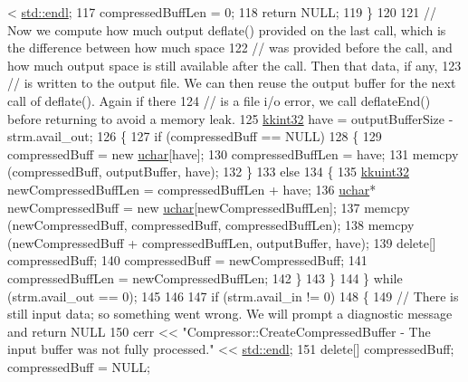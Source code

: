 \begin{DoxyCode}
      < \hyperlink{namespace_k_k_b_ad1f50f65af6adc8fa9e6f62d007818a8}{std::endl};
117         compressedBuffLen = 0;
118         \textcolor{keywordflow}{return} NULL;
119       \}
120       
121       \textcolor{comment}{// Now we compute how much output deflate() provided on the last call, which is the difference
       between how much space}
122       \textcolor{comment}{// was provided before the call, and how much output space is still available after the call. Then
       that data, if any,}
123       \textcolor{comment}{// is written to the output file. We can then reuse the output buffer for the next call of deflate().
       Again if there}
124       \textcolor{comment}{// is a file i/o error, we call deflateEnd() before returning to avoid a memory leak.}
125       \hyperlink{namespace_k_k_b_a8fa4952cc84fda1de4bec1fbdd8d5b1b}{kkint32} have = outputBufferSize - strm.avail\_out;
126       \{
127         \textcolor{keywordflow}{if}  (compressedBuff == NULL)
128         \{
129           compressedBuff = \textcolor{keyword}{new} \hyperlink{namespace_k_k_b_ace9969169bf514f9ee6185186949cdf7}{uchar}[have];
130           compressedBuffLen = have;
131           memcpy (compressedBuff, outputBuffer, have);
132         \}
133         \textcolor{keywordflow}{else}
134         \{
135           \hyperlink{namespace_k_k_b_af8d832f05c54994a1cce25bd5743e19a}{kkuint32}  newCompressedBuffLen = compressedBuffLen + have;
136           \hyperlink{namespace_k_k_b_ace9969169bf514f9ee6185186949cdf7}{uchar}*  newCompressedBuff = \textcolor{keyword}{new} \hyperlink{namespace_k_k_b_ace9969169bf514f9ee6185186949cdf7}{uchar}[newCompressedBuffLen];
137           memcpy (newCompressedBuff, compressedBuff, compressedBuffLen);
138           memcpy (newCompressedBuff + compressedBuffLen, outputBuffer, have);
139           \textcolor{keyword}{delete}[]  compressedBuff;
140           compressedBuff    = newCompressedBuff;
141           compressedBuffLen = newCompressedBuffLen;
142         \}
143       \}
144     \} \textcolor{keywordflow}{while} (strm.avail\_out == 0);
145    
146 
147     \textcolor{keywordflow}{if}  (strm.avail\_in != 0)
148     \{
149       \textcolor{comment}{// There is still input data;  so something went wrong. We will prompt a diagnostic message and
       return NULL}
150       cerr << \textcolor{stringliteral}{"Compressor::CreateCompressedBuffer   -  The input buffer was not fully processed."} << 
      \hyperlink{namespace_k_k_b_ad1f50f65af6adc8fa9e6f62d007818a8}{std::endl};
151       \textcolor{keyword}{delete}[]  compressedBuff;  compressedBuff  = NULL;

\end{DoxyCode}
